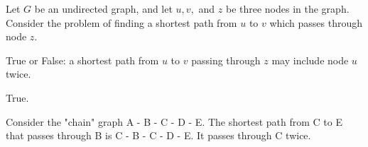 \begin{prob}
    Let $G$ be an undirected graph, and let $u, v,$ and $z$ be three nodes in the graph. Consider
    the problem of finding a shortest path from $u$ to $v$ which passes through node $z$.

    True or False: a shortest path from $u$ to $v$ passing through $z$ may include node $u$ twice.

    \begin{soln}
        True.

        Consider the "chain" graph A - B - C - D - E. The shortest path from C to E
        that passes through B is C - B - C - D - E. It passes through C twice.
    \end{soln}

\end{prob}
